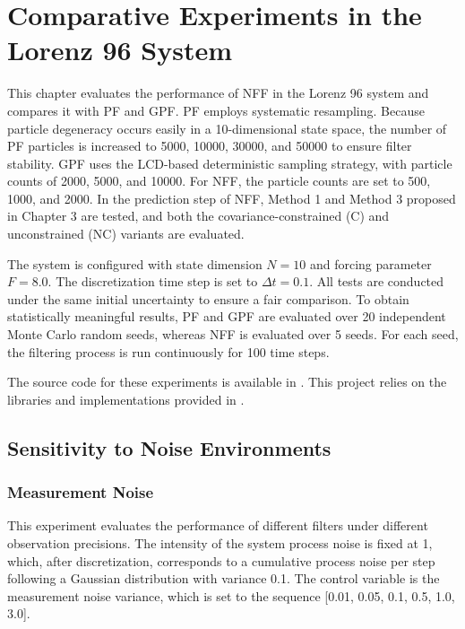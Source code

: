 \chapter{Comparative Experiments in the Lorenz 96 System}
\label{chap:lorenz96_experiments}

This chapter evaluates the performance of NFF in the Lorenz 96 system and compares it with PF and GPF. PF employs systematic resampling. Because particle degeneracy occurs easily in a 10-dimensional state space, the number of PF particles is increased to 5000, 10000, 30000, and 50000 to ensure filter stability. GPF uses the LCD-based deterministic sampling strategy, with particle counts of 2000, 5000, and 10000. For NFF, the particle counts are set to 500, 1000, and 2000. In the prediction step of NFF, Method 1 and Method 3 proposed in Chapter 3 are tested, and both the covariance-constrained (C) and unconstrained (NC) variants are evaluated.

The system is configured with state dimension $N=10$ and forcing parameter $F=8.0$. The discretization time step is set to $\Delta t=0.1$. All tests are conducted under the same initial uncertainty to ensure a fair comparison. To obtain statistically meaningful results, PF and GPF are evaluated over 20 independent Monte Carlo random seeds, whereas NFF is evaluated over 5 seeds. For each seed, the filtering process is run continuously for 100 time steps.

The source code for these experiments is available in \cite{Code_MA25_Wang}. This project relies on the libraries and implementations provided in \cite{Code_Filters_JL, Code_LCD_numeric, Code_DetGaussSampling}.

\section{Sensitivity to Noise Environments}
\label{sec:noise_sensitivity}

\subsection{Measurement Noise}
\label{subsec:measurement_noise}

This experiment evaluates the performance of different filters under different observation precisions. The intensity of the system process noise is fixed at 1, which, after discretization, corresponds to a cumulative process noise per step following a Gaussian distribution with variance 0.1. The control variable is the measurement noise variance, which is set to the sequence [0.01, 0.05, 0.1, 0.5, 1.0, 3.0].

